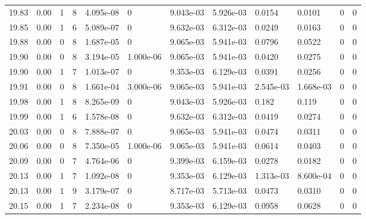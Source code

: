 \documentclass[preview]{standalone}
\begin{document}
{{{{{{{\begin{tabular}{L{1.2cm}C{1.2cm} C{0.3cm}C{0.5cm} C{1.4cm}C{1.4cm} C{1.4cm}C{1.4cm} C{1.6cm}C{1.6cm} C{1.6cm}C{1.6cm}}
  19.83  &  0.00  & 1     &  8 &  4.095e-08  & 0  &  9.043e-03&   5.926e-03& 0.0154 & 0.0101   &  0 & 0  \\ 
  19.85  &  0.00  & 1     &  6 &  5.089e-07  & 0  &  9.632e-03&   6.312e-03& 0.0249 & 0.0163   &  0 & 0  \\ 
  19.88  &  0.00  & 0     &  8 &  1.687e-05  & 0  &  9.065e-03&   5.941e-03& 0.0796 & 0.0522   &  0 & 0  \\ 
  19.90  &  0.00  & 0     &  8 &  3.194e-05  & 1.000e-06  &  9.065e-03&   5.941e-03& 0.0420 & 0.0275   &  0 & 0  \\ 
  19.90  &  0.00  & 1     &  7 &  1.013e-07  & 0  &  9.353e-03&   6.129e-03& 0.0391 & 0.0256   &  0 & 0  \\ 
  19.91  &  0.00  & 0     &  8 &  1.661e-04  & 3.000e-06  &  9.065e-03&   5.941e-03& 2.545e-03 & 1.668e-03   &  0 & 0  \\ 
  19.98  &  0.00  & 1     &  8 &  8.265e-09  & 0  &  9.043e-03&   5.926e-03& 0.182 & 0.119   &  0 & 0  \\ 
  19.99  &  0.00  & 1     &  6 &  1.578e-08  & 0  &  9.632e-03&   6.312e-03& 0.0419 & 0.0274   &  0 & 0  \\ 
  20.03  &  0.00  & 0     &  8 &  7.888e-07  & 0  &  9.065e-03&   5.941e-03& 0.0474 & 0.0311   &  0 & 0  \\ 
  20.06  &  0.00  & 0     &  8 &  7.350e-05  & 1.000e-06  &  9.065e-03&   5.941e-03& 0.0614 & 0.0403   &  0 & 0  \\ 
  20.09  &  0.00  & 0     &  7 &  4.764e-06  & 0  &  9.399e-03&   6.159e-03& 0.0278 & 0.0182   &  0 & 0  \\ 
  20.13  &  0.00  & 1     &  7 &  1.092e-08  & 0  &  9.353e-03&   6.129e-03& 1.313e-03 & 8.600e-04   &  0 & 0  \\ 
  20.13  &  0.00  & 1     &  9 &  3.179e-07  & 0  &  8.717e-03&   5.713e-03& 0.0473 & 0.0310   &  0 & 0  \\ 
  20.15  &  0.00  & 1     &  7 &  2.234e-08  & 0  &  9.353e-03&   6.129e-03& 0.0958 & 0.0628   &  0 & 0  \\ 
\hline 
\end{tabular} 

}}}}}}}
\end{document}
